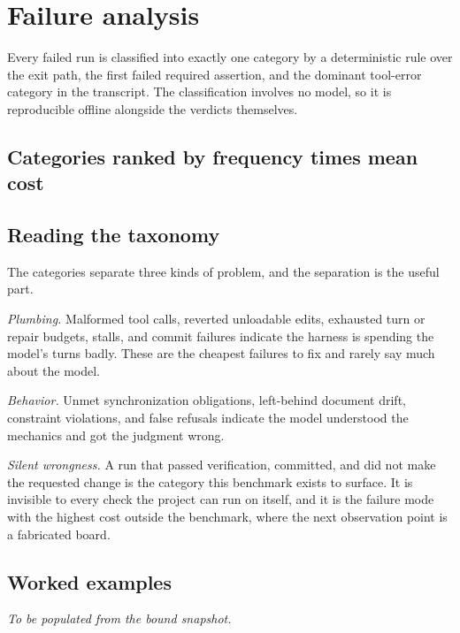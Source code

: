 \section{Failure analysis}
\label{sec:failures}


Every failed run is classified into exactly one category by a deterministic rule over the exit path, the first failed required assertion, and the dominant tool-error category in the transcript. The classification involves no model, so it is reproducible offline alongside the verdicts themselves.

\subsection{Categories ranked by frequency times mean cost}

\tableFailures

\subsection{Reading the taxonomy}

The categories separate three kinds of problem, and the separation is the useful part.

\emph{Plumbing.} Malformed tool calls, reverted unloadable edits, exhausted turn or repair budgets, stalls, and commit failures indicate the harness is spending the model's turns badly. These are the cheapest failures to fix and rarely say much about the model.

\emph{Behavior.} Unmet synchronization obligations, left-behind document drift, constraint violations, and false refusals indicate the model understood the mechanics and got the judgment wrong.

\emph{Silent wrongness.} A run that passed verification, committed, and did not make the requested change is the category this benchmark exists to surface. It is invisible to every check the project can run on itself, and it is the failure mode with the highest cost outside the benchmark, where the next observation point is a fabricated board.

\subsection{Worked examples}

\emph{To be populated from the bound snapshot.}
